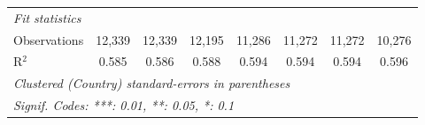\begin{tabular}{lccccccc}
   \midrule \emph{Fit statistics}\\
   Observations                                                                    & 12,339  & 12,339        & 12,195        & 11,286        & 11,272        & 11,272        & 10,276\\  
   R$^2$                                                                           & 0.585   & 0.586         & 0.588         & 0.594         & 0.594         & 0.594         & 0.596\\  
   \midrule
   \multicolumn{8}{l}{\emph{Clustered (Country) standard-errors in parentheses}}\\
   \multicolumn{8}{l}{\emph{Signif. Codes: ***: 0.01, **: 0.05, *: 0.1}}\\
\end{tabular}
\par\endgroup


